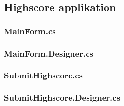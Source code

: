\subsection*{Highscore applikation}
\subsubsection*{MainForm.cs}


\subsubsection*{MainForm.Designer.cs}


\subsubsection*{SubmitHighscore.cs}


\subsubsection*{SubmitHighscore.Designer.cs}
